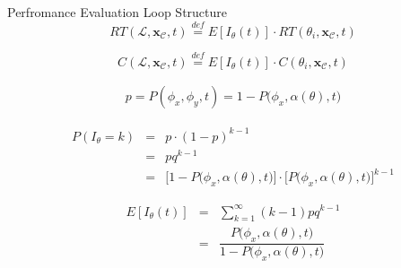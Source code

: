 \documentclass[13.5pt]{beamer}
\newcommand{\mathDef}{\overset{\textit{def}}{=}}
\begin{document}

\begin{frame}[noframenumbering]
	
	\begin{block}{Perfromance Evaluation Loop Structure}
		\begin{equation}
			RT(\mathcal{L},\textbf{x}_{\mathcal{C}}, t) \mathDef E[I_{\theta}(t)] \cdot RT(\theta_i,\textbf{x}_{\mathcal{C}}, t)
		\end{equation}
		
		\begin{equation}
			C(\mathcal{L},\textbf{x}_{\mathcal{C}}, t) \mathDef E[I_{\theta}(t)] \cdot C(\theta_i,\textbf{x}_{\mathcal{C}}, t)
		\end{equation}
	\end{block}


\begin{eqnarray}
	p = P(\phi_x,\phi_y,t) = 1 - P\Big(\phi_{x}, \alpha(\theta),t\Big)
\end{eqnarray}

\end{frame} 

\begin{frame}[noframenumbering]
	
\begin{eqnarray}
	P(I_{\theta} = k) & = & p \cdot (1-p)^{k-1} \nonumber \\
	& = & pq^{k-1} \nonumber \\
	& = & \Big[  1 - P\Big(\phi_{x}, \alpha(\theta),t\Big) \Big] \cdot \bigg[  P\Big(\phi_{x}, \alpha(\theta),t\Big) \bigg] ^{k-1}
\end{eqnarray}

\begin{eqnarray}
	E[I_{\theta}(t)] & = & \sum_{k = 1}^\infty (k-1) pq^{k-1} \nonumber \\
	& = & \dfrac{P\Big(\phi_{x}, \alpha(\theta),t\Big)}{1 - P\Big(\phi_{x}, \alpha(\theta),t\Big)} 
\end{eqnarray}
\end{frame} 
\end{document}
